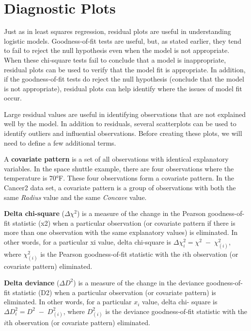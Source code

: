 \documentclass[
]{report}
\begin{document}
\section{\texorpdfstring{\textbf{Diagnostic Plots}}{Diagnostic Plots}}\label{diagnostic-plots}

Just as in least squares regression, residual plots are useful in understanding logistic models. Goodness‐of‐fit tests are useful, but, as stated earlier, they tend to fail to reject the null hypothesis even when the model is not appropriate. When these chi‐square tests fail to conclude that a model is inappropriate, residual plots can be used to verify that the model fit is appropriate. In addition, if the goodness‐of‐fit tests do reject the null hypothesis (conclude that the model is not appropriate), residual plots can help identify where the issues of model fit occur.

Large residual values are useful in identifying observations that are not explained well by the model. In addition to residuals, several scatterplots can be used to identify outliers and influential observations. Before creating these plots, we will need to define a few additional terms.

A \textbf{covariate pattern} is a set of all observations with identical explanatory variables. In the space shuttle example, there are four observations where the temperature is 70°F. These four observations form a covariate pattern. In the Cancer2 data set, a covariate pattern is a group of observations with both the same \emph{Radius} value and the same \emph{Concave} value.

\textbf{Delta chi-square} (\(\Delta \chi^2\)) is a measure of the change in the Pearson goodness-of-fit statistic (x2) when a
particular observation (or covariate pattern if there is more than one observation with the same explanatory
values) is eliminated. In other words, for a particular xi value, delta chi-square is \(\Delta \chi^2_i = \chi^2 \;-\;\chi^2_{(i)}\), where \(\chi^2_{(i)}\) is the Pearson goodness‐of‐fit statistic with the \(i\)th observation (or covariate pattern) eliminated.

\textbf{Delta deviance} (\(\Delta D^2\)) is a measure of the change in the deviance goodness-of-fit statistic (D2) when a
particular observation (or covariate pattern) is eliminated. In other words, for a particular \(x_i\) value, delta chi-
square is \(\Delta D^2_i = D^2 \;-\; D^2_{(i)}\), where \(D^2_{(i)}\) is the deviance goodness‐of‐fit statistic with the \(i\)th observation (or covariate pattern) eliminated.
\end{document}
